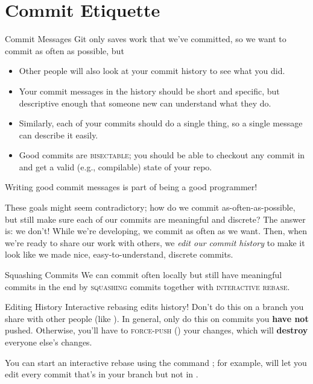 \section{Commit Etiquette}
\begin{frame}[fragile]{Commit Messages}
  Git only saves work that we've committed, so we want to commit as often as
  possible, but\textellipsis\pause

  \begin{itemize}
    \item Other people will also look at your commit history to see what you
      did. \pause

    \item Your commit messages in the history should be short and specific, but
      descriptive enough that someone new can understand what they do. \pause

    \item Similarly, each of your commits should do a single thing, so a single
      message can describe it easily. \pause

    \item Good commits are \textsc{bisectable}; you should be able to checkout
      any commit in  and get a valid (e.g., compilable) state of your
      repo. \pause
  \end{itemize}

  Writing good commit messages is part of being a good programmer!
\end{frame}

These goals might seem contradictory; how do we commit as-often-as-possible,
but still make sure each of our commits are meaningful and discrete?  The
answer is: we don't!  While we're developing, we commit as often as we want.
Then, when we're ready to share our work with others, we \textit{edit our
commit history} to make it look like we made nice, easy-to-understand, discrete
commits.

\begin{frame}{Squashing Commits}
  We can commit often locally but still have meaningful commits in the end by
  \textsc{squashing} commits together with \textsc{interactive rebase}.
  \pause

  \begin{alertblock}{Editing History}
    Interactive rebasing edits history!  Don't do this on a branch you share
    with other people (like ).  In general, only do this on commits
    you \textbf{have not} pushed.  Otherwise, you'll have to
    \textsc{force-push} () your changes, which will
    \textbf{destroy} everyone else's changes.
  \end{alertblock}
  \pause

  You can start an interactive rebase using the command ; for example,  will
  let you edit every commit that's in your branch but not in .
\end{frame}

